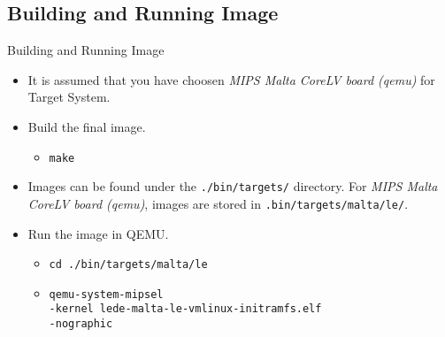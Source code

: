 \subsection{Building and Running Image}
\begin{frame}{Building and Running Image}
    \pause
    \begin{itemize}[<+-|alert@+>]
        \item It is assumed that you have choosen \textit{MIPS Malta CoreLV board (qemu)} for Target System.
        \item Build the final image.
        \begin{itemize}
            \item \texttt{make}
        \end{itemize}
        \item Images can be found under the \texttt{./bin/targets/} directory. For \textit{MIPS Malta CoreLV board (qemu)}, images are stored in \texttt{.bin/targets/malta/le/}.
        \item Run the image in QEMU.
        \begin{itemize}
            \item \texttt{cd ./bin/targets/malta/le}
            \item \texttt{qemu-system-mipsel} \\
                  \texttt{-kernel lede-malta-le-vmlinux-initramfs.elf} \\
                  \texttt{-nographic}
        \end{itemize}
    \end{itemize}
\end{frame}